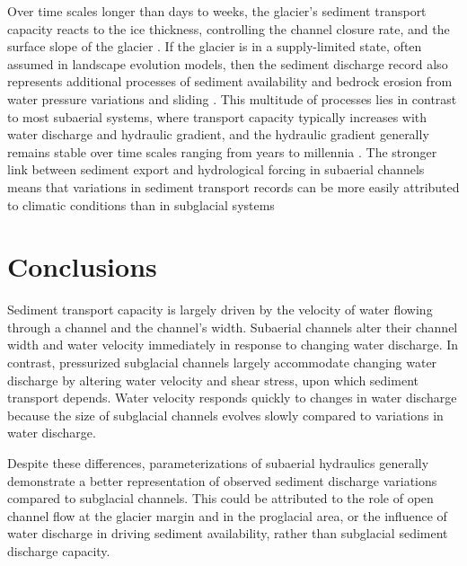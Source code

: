 \documentclass[11pt]{article}
\begin{document}
Over time scales longer than days to weeks, the glacier's sediment transport capacity reacts to the ice thickness, controlling the channel closure rate, and the surface slope of the glacier \citep[Figure~\ref{fig:multi_run}, ~ Section~\ref{sect:sub_mode}; ][]{rothlisberger1972,shreve1972,stevens2022}.
If the glacier is in a supply-limited state, often assumed in landscape evolution models, then the sediment discharge record also represents additional processes of sediment availability and bedrock erosion from  water pressure variations and sliding  \citep[e.g.][]{iverson2012,herman2015,delaney2023}.
This multitude of processes lies in contrast to most subaerial systems, where transport capacity typically increases with water discharge and hydraulic gradient, and the hydraulic gradient generally remains stable over time scales ranging from years to millennia \citep[Section~\ref{sect:fluv}; e.g.][]{muller1968,whipple1999,wickert2019}.
The stronger link between sediment export and hydrological forcing in subaerial channels means that variations in sediment transport records can be more easily attributed to climatic conditions than in  subglacial systems



\section{Conclusions}

Sediment transport capacity is largely driven by the velocity of water flowing through a channel and the channel's width.
Subaerial channels  alter their channel width and water velocity immediately in response to changing water discharge.
In contrast, pressurized subglacial channels largely accommodate changing water discharge by altering water velocity and shear stress, upon which sediment transport depends.
Water velocity responds quickly to changes in water discharge because the size of subglacial channels evolves slowly compared to variations in water discharge.

Despite these differences, parameterizations of subaerial hydraulics generally demonstrate a better representation of observed sediment discharge variations compared to subglacial channels.
This could be attributed to the role of open channel flow at the glacier margin and in the proglacial area, or the influence of water discharge in driving sediment availability, rather than subglacial sediment discharge capacity.
\end{document}
